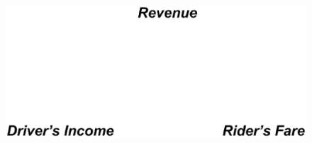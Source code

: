 \documentclass[t]{beamer}
\begin{document}
\begin{frame}
\begin{itemize}
{\begin{figure}
	\centering
    \includegraphics[width = 0.75\columnwidth]{pricing2.eps}
\end{figure}
}
\end{itemize}
\end{frame}
\end{document}
